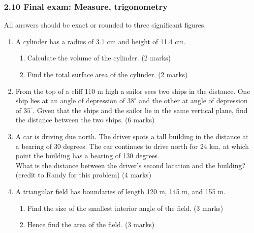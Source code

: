 \documentclass[12pt, twoside]{article}
\begin{document}
\subsubsection*{2.10 Final exam: Measure, trigonometry}
All answers should be exact or rounded to three significant figures.

\begin{enumerate}

\item A cylinder has a radius of 3.1 cm and height of 11.4 cm. 
  \begin{enumerate}
    \item Calculate the volume of the cylinder. \hfill (2 marks)
    \item Find the total surface area of the cylinder. \hfill (2 marks)
  \end{enumerate}

\item From the top of a cliff 110 m high a sailor sees two ships in the distance. One ship lies at an angle of depression of $38^\circ$ and the other at angle of depression of $35^\circ$. Given that the ships and the sailor lie in the same vertical plane, find the distance between the two ships. \hfill (6 marks)

\item A car is driving due north. The driver spots a tall building in the distance at a bearing of 30 degrees. The car continues to drive north for 24 km, at which point the building has a bearing of 130 degrees. \\[0.25cm]
What is the distance between the driver's second location and the building? \\
(credit to Randy for this problem) \hfill (4 marks)
\begin{center}
\end{center}

\item A triangular field has boundaries of length 120 m, 145 m, and 155 m. 
\begin{enumerate}
  \item Find the size of the smallest interior angle of the field. \hfill (3 marks)
  \item Hence find the area of the field. \hfill (3 marks)
\end{enumerate}


\end{enumerate}
\end{document}
